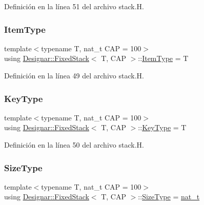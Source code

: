 Definición en la línea 51 del archivo stack.\+H.

\mbox{\label{class_designar_1_1_fixed_stack_a07f33a0a97fdebadd335de2f7f485942}} 
\subsubsection{\texorpdfstring{Item\+Type}{ItemType}}
{\footnotesize\ttfamily template$<$typename T, nat\+\_\+t C\+AP = 100$>$ \\
using \hyperlink{class_designar_1_1_fixed_stack}{Designar\+::\+Fixed\+Stack}$<$ T, C\+AP $>$\+::\hyperlink{class_designar_1_1_fixed_stack_a07f33a0a97fdebadd335de2f7f485942}{Item\+Type} =  T}



Definición en la línea 49 del archivo stack.\+H.

\mbox{\label{class_designar_1_1_fixed_stack_a9969f7d11746d55fe367a229bb75fa8f}} 
\subsubsection{\texorpdfstring{Key\+Type}{KeyType}}
{\footnotesize\ttfamily template$<$typename T, nat\+\_\+t C\+AP = 100$>$ \\
using \hyperlink{class_designar_1_1_fixed_stack}{Designar\+::\+Fixed\+Stack}$<$ T, C\+AP $>$\+::\hyperlink{class_designar_1_1_fixed_stack_a9969f7d11746d55fe367a229bb75fa8f}{Key\+Type} =  T}



Definición en la línea 50 del archivo stack.\+H.

\mbox{\label{class_designar_1_1_fixed_stack_ae82564eb2309ec7a1bfd0c5bfbefc581}} 
\subsubsection{\texorpdfstring{Size\+Type}{SizeType}}
{\footnotesize\ttfamily template$<$typename T, nat\+\_\+t C\+AP = 100$>$ \\
using \hyperlink{class_designar_1_1_fixed_stack}{Designar\+::\+Fixed\+Stack}$<$ T, C\+AP $>$\+::\hyperlink{class_designar_1_1_fixed_stack_ae82564eb2309ec7a1bfd0c5bfbefc581}{Size\+Type} =  \hyperlink{namespace_designar_aa72662848b9f4815e7bf31a7cf3e33d1}{nat\+\_\+t}}



